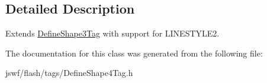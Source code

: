 \subsection{Detailed Description}
Extends \hyperlink{classjswf_1_1flash_1_1tags_1_1_define_shape3_tag}{Define\+Shape3\+Tag} with support for {\ttfamily L\+I\+N\+E\+S\+T\+Y\+L\+E2}. 

The documentation for this class was generated from the following file\+:\begin{DoxyCompactItemize}
\item 
jswf/flash/tags/Define\+Shape4\+Tag.\+h\end{DoxyCompactItemize}
